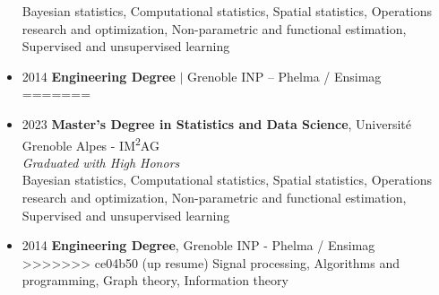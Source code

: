 \documentclass{article}
\begin{document}
\begin{itemize}
    \tabto{2cm} Bayesian statistics, Computational statistics, Spatial statistics, Operations research and optimization, \tabto{2cm} Non-parametric and functional estimation, Supervised and unsupervised learning
    \item[] 2014 \tabto{2cm} \textbf{Engineering Degree} $\vert$ Grenoble INP – Phelma / Ensimag \\[.1 cm]
=======
    \item[] 2023 \tabto{2cm} \textbf{Master’s Degree in Statistics and Data Science}, Université Grenoble Alpes - IM\textsuperscript{2}AG \\[.15 cm]
    \tabto{2cm} \textit{Graduated with High Honors} \\[.1 cm]
    \tabto{2cm} Bayesian statistics, Computational statistics, Spatial statistics, Operations research and optimization, \tabto{2cm} Non-parametric and functional estimation, Supervised and unsupervised learning
    \item[] 2014 \tabto{2cm} \textbf{Engineering Degree}, Grenoble INP - Phelma / Ensimag \\[.1 cm]
>>>>>>> ce04b50 (up resume)
    \tabto{2cm} Signal processing, Algorithms and programming, Graph theory, Information theory
\end{itemize}
\end{document}
